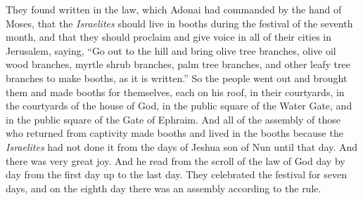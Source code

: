 \begin{biblechapter}
\verse They found written in the law, which Adonai had commanded by the hand of Moses, that the \textit{Israelites} should live in booths during the festival of the seventh month,
\verse and that they should proclaim and give voice in all of their cities in Jerusalem, saying, “Go out to the hill and bring olive tree branches, olive oil wood branches, myrtle shrub branches, palm tree branches, and other leafy tree branches to make booths, as it is written.”
\verse So the people went out and brought them and made booths for themselves, each on his roof, in their courtyards, in the courtyards of the house of God, in the public square of the Water Gate, and in the public square of the Gate of Ephraim.
\verse And all of the assembly of those who returned from captivity made booths and lived in the booths because the \textit{Israelites} had not done it from the days of Jeshua son of Nun until that day. And there was very great joy.
\verse And he read from the scroll of the law of God day by day from the first day up to the last day. They celebrated the festival for seven days, and on the eighth day there was an assembly according to the rule.
\end{biblechapter}

